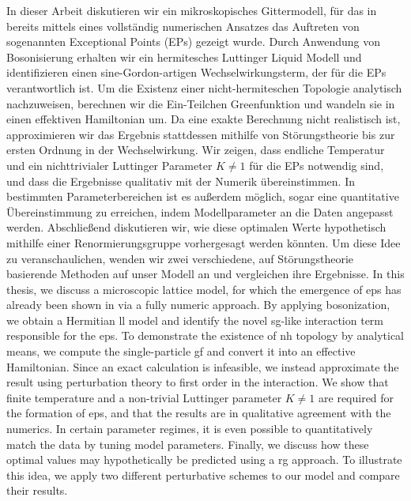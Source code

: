 In dieser Arbeit diskutieren wir ein mikroskopisches Gittermodell, für das in \cite{EP_DynamicInduced_Quenched_Lehmann_2021} bereits mittels eines vollständig numerischen Ansatzes das Auftreten von sogenannten Exceptional Points (EPs) gezeigt wurde.
Durch Anwendung von Bosonisierung erhalten wir ein hermitesches Luttinger Liquid Modell und identifizieren einen sine-Gordon-artigen Wechselwirkungsterm, der für die EPs verantwortlich ist.
Um die Existenz einer nicht-hermiteschen Topologie analytisch nachzuweisen, berechnen wir die Ein-Teilchen Greenfunktion und wandeln sie in einen effektiven Hamiltonian um.
Da eine exakte Berechnung nicht realistisch ist, approximieren wir das Ergebnis stattdessen mithilfe von Störungstheorie bis zur ersten Ordnung in der Wechselwirkung.
Wir zeigen, dass endliche Temperatur und ein nichttrivialer Luttinger Parameter $K\neq 1$ für die EPs notwendig sind, und dass die Ergebnisse qualitativ mit der Numerik übereinstimmen.
In bestimmten Parameterbereichen ist es au{\ss}erdem möglich, sogar eine quantitative Übereinstimmung zu erreichen, indem Modellparameter an die Daten angepasst werden.
Abschlie{\ss}end diskutieren wir, wie diese optimalen Werte hypothetisch mithilfe einer Renormierungsgruppe vorhergesagt werden könnten.
Um diese Idee zu veranschaulichen, wenden wir zwei verschiedene, auf Störungstheorie basierende Methoden auf unser Modell an und vergleichen ihre Ergebnisse.
\nextabstract[english]
In this thesis, we discuss a microscopic lattice model, for which the emergence of \glspl{ep} has already been shown in \cite{EP_DynamicInduced_Quenched_Lehmann_2021} via a fully numeric approach.
By applying bosonization, we obtain a Hermitian \acrlong{ll} model and identify the novel \acrlong{sg}-like interaction term responsible for the \glspl{ep}.
To demonstrate the existence of \acrlong{nh} topology by analytical means, we compute the single-particle \acrlong{gf} and convert it into an effective Hamiltonian. 
Since an exact calculation is infeasible, we instead approximate the result using perturbation theory to first order in the interaction.
We show that finite temperature and a non-trivial Luttinger parameter $K\neq 1$ are required for the formation of \glspl{ep}, and that the results are in qualitative agreement with the numerics.
In certain parameter regimes, it is even possible to quantitatively match the data by tuning model parameters.
Finally, we discuss how these optimal values may hypothetically be predicted using a \acrlong{rg} approach.
To illustrate this idea, we apply two different perturbative schemes to our model and compare their results.
\glsresetall
